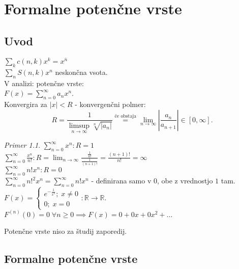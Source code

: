 \documentclass[a4paper, 12pt]{book}
\theoremstyle{definition}
\theoremstyle{remark}
\newtheorem*{ex}{Primer}
\newcommand{\R}{\mathbb{R}}
\begin{document}
\chapter{Formalne potenčne vrste}


\section{Uvod}

$\sum_k c(n,k) x^k = x^{\overline{n}}$ \\
$\sum_n S(n,k) x^n$ neskončna vsota. \\
V analizi: potenčne vrste: \\
$F(x) = \sum_{n=0}^{\infty} a_n x^n$. \\
Konvergira za $|x| < R$ - konvergenčni polmer:
\begin{equation*}
  R = \frac{1}{\limsup_{n \to \infty} \sqrt[n]{|a_n|}} \stackrel{\text{če obstaja}}{=}
  \lim_{n \to \infty} \left|\frac{a_n}{a_{n+1}}\right| \in [0, \infty].
\end{equation*}
\begin{ex}
  $\sum_{n=0}^{\infty} x^n: R = 1$ \\
  $\sum_{n=0}^{\infty} \frac{x^n}{n!}: R = \lim_{n \to \infty} \frac{\frac{1}{n!}}{\frac{1}{(n+1)!}}
    = \frac{(n+1)!}{n!} = \infty$ \\
  $\sum_{n=0}^{\infty} n! x^n: R = 0$ \\
  $\sum_{n=0}^{\infty} n!^2 x^n = \sum_{n=0}^{\infty} n! x^n$ - definirana samo v $0$, obe z vrednostjo $1$ tam. \\
  $F(x) = \begin{cases}
    e^{-\frac{1}{x^2}}; \; x \neq 0 \\
    0; \; x = 0
  \end{cases}: \R \to \R$. \\
  $F^{(n)}(0) = 0 \; \forall n \geq 0 \implies F(x) = 0 + 0x + 0x^2 + \dots$
\end{ex}
Potenčne vrste niso  za študij zaporedij.


\section{Formalne potenčne vrste}
\end{document}
